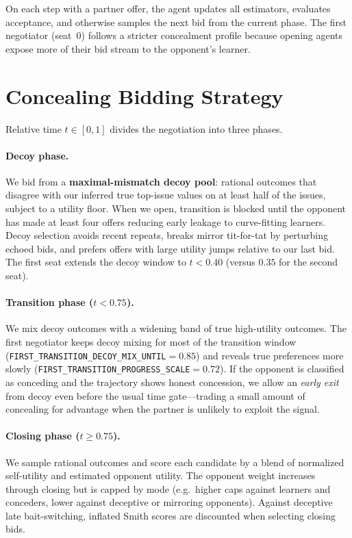 \documentclass[11pt]{article}
\begin{document}
On each step with a partner offer, the agent updates all estimators, evaluates acceptance, and otherwise samples the next bid from the current phase.
The first negotiator (seat~0) follows a stricter concealment profile because opening agents
expose more of their bid stream to the opponent's learner.

\section{Concealing Bidding Strategy}

Relative time $t \in [0,1]$ divides the negotiation into three phases.

\paragraph{Decoy phase.}
We bid from a \textbf{maximal-mismatch decoy pool}: rational outcomes that disagree with our
inferred true top-issue values on at least half of the issues, subject to a utility floor.
When we open, transition is blocked until the opponent has made at least four offers
reducing early leakage to curve-fitting learners.
Decoy selection avoids recent repeats, breaks mirror tit-for-tat by perturbing echoed bids, and
prefers offers with large utility jumps relative to our last bid.
The first seat extends the decoy window to $t < 0.40$ (versus $0.35$ for the second seat).

\paragraph{Transition phase ($t < 0.75$).}
We mix decoy outcomes with a widening band of true high-utility outcomes.
The first negotiator keeps decoy mixing for most of the transition window
(\texttt{FIRST\_TRANSITION\_DECOY\_MIX\_UNTIL}${}=0.85$) and reveals true preferences more
slowly (\texttt{FIRST\_TRANSITION\_PROGRESS\_SCALE}${}=0.72$).
If the opponent is classified as conceding and the trajectory shows honest concession, we allow
an \emph{early exit} from decoy even before the usual time gate---trading a small amount of
concealing for advantage when the partner is unlikely to exploit the signal.

\paragraph{Closing phase ($t \ge 0.75$).}
We sample rational outcomes and score each candidate by a blend of normalized self-utility and
estimated opponent utility.
The opponent weight increases through closing but is capped by mode
(e.g.\ higher caps against learners and conceders, lower against deceptive or mirroring
opponents).
Against deceptive late bait-switching, inflated Smith scores are discounted when selecting
closing bids.
\end{document}
